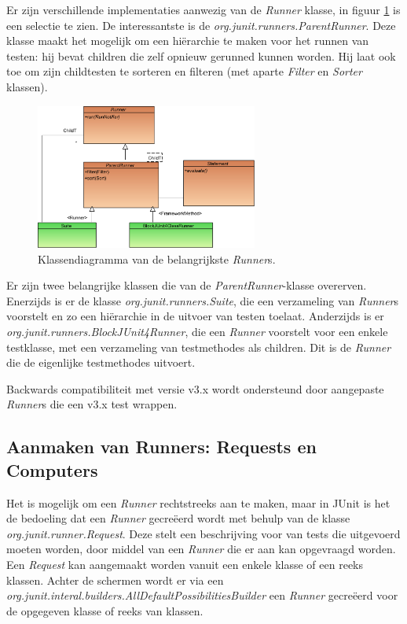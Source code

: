 \documentclass[i1]{oss}
\begin{document}
Er zijn verschillende implementaties aanwezig van de \emph{Runner} klasse, in figuur \ref{fig:diagrams:Runner} is een selectie te zien. De interessantste is de \emph{org.junit.runners.ParentRunner}. Deze klasse maakt het mogelijk om een hi\"erarchie te maken voor het runnen van testen: hij bevat children die zelf opnieuw gerunned kunnen worden. Hij laat ook toe om zijn childtesten te sorteren en filteren (met aparte \emph{Filter} en \emph{Sorter} klassen).

\begin{figure}[hb!]
	\centering
	\includegraphics[width=0.65\textwidth]{ClassDiagramRunner}
	\caption{Klassendiagramma van de belangrijkste \emph{Runner}s.}
	\label{fig:diagrams:Runner}
\end{figure}

Er zijn twee belangrijke klassen die van de \emph{ParentRunner}-klasse overerven. Enerzijds is er de klasse \emph{org.junit.runners.Suite}, die een verzameling van \emph{Runner}s voorstelt en zo een hi\"erarchie in de uitvoer van testen toelaat. Anderzijds is er \emph{org.junit.runners.BlockJUnit4Runner}, die een \emph{Runner} voorstelt voor een enkele testklasse, met een verzameling van testmethodes als children. Dit is de \emph{Runner} die de eigenlijke testmethodes uitvoert.

Backwards compatibiliteit met versie v3.x wordt ondersteund door aangepaste \emph{Runner}s die een v3.x test wrappen.

\subsection{Aanmaken van Runners: Requests en Computers}

Het is mogelijk om een \emph{Runner} rechtstreeks aan te maken, maar in JUnit is het de bedoeling dat een \emph{Runner} gecre\"eerd wordt met behulp van de klasse \emph{org.junit.runner.Request}. Deze stelt een beschrijving voor van tests die uitgevoerd moeten worden, door middel van een \emph{Runner} die er aan kan opgevraagd worden. Een \emph{Request} kan aangemaakt worden vanuit een enkele klasse of een reeks klassen. Achter de schermen wordt er via een \emph{org.junit.interal.builders.AllDefaultPossibilitiesBuilder} een \emph{Runner} gecre\"eerd voor de opgegeven klasse of reeks van klassen.
\end{document}
